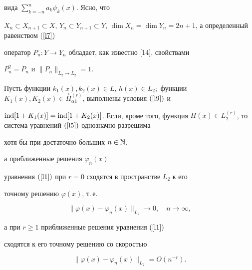 вида $\sum\limits_{k=-n}^n a_k\psi_k(x)$. Ясно, что


$X_n\subset X_{n+1}\subset X$, $Y_n\subset Y_{n+1}\subset Y$, $\dim


X_n=\dim Y_n=2n+1$, а определенный равенством (\ref{l7})


оператор $P_n:Y\rightarrow Y_n$ обладает, как известно [14], свойствами


$P_n^2=P_n$ и $\|P_n\|_{L_2\rightarrow L_2}=1$.








\begin{thm}


Пусть функции $k_1(x), k_2(x) \in


L$, $h(x) \in L_2;$ функции $K_1(x), K_2(x) \in


\overset{\circ}{H}{}_{\alpha1}^{(r)}$, выполнены условия $(\ref{l9})$ и


$\ind [1+K_1(x)]=\ind [1+K_2(x)]$. Если, кроме того, функция $H(x)\in


L_2^{(r)}$, то система уравнений $(\ref{l5})$ однозначно разрешима


хотя бы при достаточно больших $n\in\Bbb N$,


а приближенные решения $\varphi_n(x)$


уравнения $(\ref{l1})$ при $r=0$ сходятся в пространстве $L_2$ к его


точному решению $\varphi(x)$, т.\,е.


\begin{equation}


\label{l10} \|\varphi(x)-\varphi_n(x)\|_{L_2}\rightarrow 0, \quad


n\rightarrow\infty,


\end{equation}


а при $r \geqslant 1$ приближенные решения уравнения $(\ref{l1})$


сходятся к его точному решению со скоростью


\begin{equation}


\label{l11} \|\varphi(x)-\varphi_n(x)\|_{L_2}=O(n^{-r}).


\end{equation}


\end{thm}








